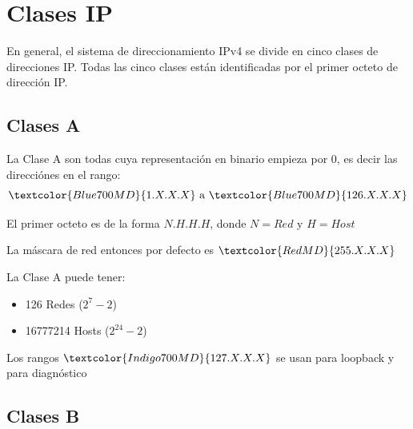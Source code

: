 \documentclass[12pt, fleqn]{report}                             %
\theoremstyle{break}                                            %
\newcommand{\Color}[2]{\textcolor{#1}{#2}}                      %
\begin{document}
        \clearpage
        \section{Clases IP}

            En general, el sistema de direccionamiento IPv4 se divide en cinco clases de direcciones IP.
            Todas las cinco clases están identificadas por el primer octeto de dirección IP.

            \subsection{Clases A}

                La Clase A son todas cuya representación en binario empieza por $0$, es decir las
                direcciónes en el rango:
                \begin{equation*}
                    \Color{Blue700MD}{1.X.X.X}
                    \text{ a }
                    \Color{Blue700MD}{126.X.X.X}
                \end{equation*}

                El primer octeto es de la forma $N.H.H.H$, donde $N = Red$ y $H = Host$

                La máscara de red entonces por defecto es $\Color{RedMD}{255.X.X.X}$

                La Clase A puede tener:
                \begin{itemize}
                    \item 126 Redes ($2^7 - 2$)
                    \item 16777214 Hosts ($2^{24} - 2$)
                \end{itemize}

                Los rangos $\Color{Indigo700MD}{127.X.X.X}$ se usan para loopback y para diagnóstico


            \subsection{Clases B}
\end{document}
